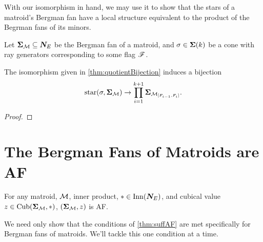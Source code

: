 \documentclass[12pt,oneside]{../../sfsuthesis}
\begin{document}
With our isomorphism in hand, we may use it to show that the stars of a matroid's Bergman fan have a local structure equivalent to the product of the Begrman fans of its minors.

\begin{lemma}\th\label{thm:starBijection}
    Let \( \bm{\Sigma}_{\mathcal{M}} \subseteq \bm{N}_E \) be the Bergman fan of a matroid,
    and \( \sigma \in \bm{\Sigma}(k) \) be a cone with ray generators corresponding to some flag \( \mathscr{F} \).

    The isomorphism given in \th\ref{thm:quotientBijection} induces a bijection
    \[
        \operatorname{star}(\sigma, \bm{\Sigma}_{\mathcal{M}}) \to \prod_{i=1}^{k+1} \bm{\Sigma}_{\mathcal{M}_{[F_{i-1}, F_i]}}.
    \]
\end{lemma}
\begin{proof}
\end{proof}

\section{The Bergman Fans of Matroids are AF}


\begin{theorem}
    For any matroid, \( \mathcal{M} \), inner product, \( \ast \in \mathrm{Inn}(\bm{N}_E) \), and cubical value \( z \in \operatorname{Cub}(\bm{\Sigma}_{\mathcal{M}}, \ast) \),
    \( (\bm{\Sigma}_{\mathcal{M}}, z) \) is AF.
\end{theorem}

We need only show that the conditions of \th\ref{thm:suffAF} are met specifically for Bergman fans of matroids.
We'll tackle this one condition at a time.
\end{document}
